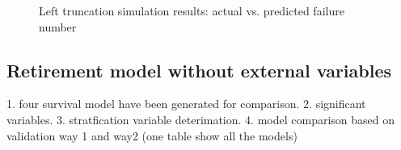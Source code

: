 \documentclass[12pt,letterpaper]{article}
\begin{document}
\begin{figure}[h!]
	\centering
	\qquad
	\caption{Left truncation simulation results: actual vs. predicted failure number}
	\label{fig:baseline}
\end{figure}

%

\subsection{Retirement model without external variables}
   1. four survival model have been generated for comparison.
   2. significant variables.
   3. stratfication variable deterimation.
   4. model comparison based on validation way 1 and way2 (one table show all the models)
\end{document}
